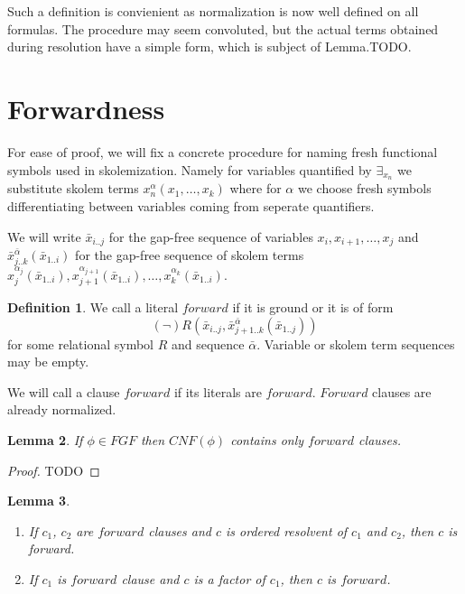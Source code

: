 \documentclass[english, shortabstract]{iithesis}
\theoremstyle{definition} \newtheorem{definition}{Definition}[chapter]
\theoremstyle{remark} \newtheorem{remark}[definition]{Observation}
\theoremstyle{plain} \newtheorem{theorem}[definition]{Theorem}
\theoremstyle{plain} \newtheorem{lemma}[definition]{Lemma}
\begin{document}
Such a definition is convienient as normalization is now well defined on all formulas. 
The procedure may seem convoluted, but the actual terms obtained during resolution have a simple form, which is subject of Lemma.TODO.

\section{Forwardness}

For ease of proof, we will fix a concrete procedure for naming fresh functional symbols used in skolemization. 
Namely for variables quantified by $\exists_{x_n}$ we substitute skolem terms $x^\alpha_n(x_1, \dots, x_{k})$ where 
for $\alpha$ we choose fresh symbols differentiating between variables coming from seperate quantifiers.

We will write $\bar{x}_{i..j}$ for the gap-free sequence of variables $x_i, x_{i+1}, \dots, x_j$ and 
$\bar{x}^{\bar{\alpha}}_{j..k}(\bar{x}_{1..i})$ for the gap-free sequence of skolem terms $x^{\alpha_j}_{j}(\bar{x}_{1..i}), x^{\alpha_{j+1}}_{j+1}(\bar{x}_{1..i}), \dots, x^{\alpha_k}_k(\bar{x}_{1..i})$.

\begin{definition}
We call a literal $forward$ if it is ground or it is of form
$$(\lnot)R(\bar{x}_{i..j}, \bar{x}^{\bar{\alpha}}_{{j+1..k}}(\bar{x}_{1..j}))$$
for some relational symbol $R$ and sequence $\bar{\alpha}$. Variable or skolem term sequences may be empty.
\end{definition}

We will call a clause $forward$ if its literals are $forward$. $Forward$ clauses are already normalized.

\begin{lemma}
If $\phi \in FGF$ then $CNF(\phi)$ contains only $forward$ clauses.
\end{lemma}

\begin{proof}
TODO
\end{proof}

\begin{lemma}
\begin{enumerate}
    \item If $c_1$, $c_2$ are $forward$ clauses and $c$ is ordered resolvent of $c_1$ and $c_2$, then $c$ is forward.
    \item If $c_1$ is $forward$ clause and $c$ is a factor of $c_1$, then $c$ is $forward$.  
\end{enumerate}
\end{lemma}
\end{document}
